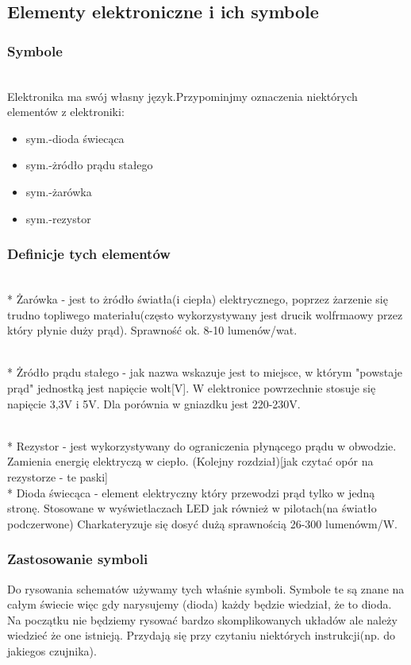 	\subsection{Elementy elektroniczne i ich symbole}
	\subsubsection {Symbole}
	\\Elektronika ma swój własny język.Przypominjmy oznaczenia niektórych elementów z elektroniki:
\begin{itemize}
	\item sym.-dioda świecąca
	\item sym.-żródło prądu stałego
	\item sym.-żarówka
	\item sym.-rezystor
\end{itemize}

   \subsubsection{Definicje tych elementów}
\\* Żarówka - jest to żródło światła(i ciepła) elektrycznego, poprzez żarzenie się trudno topliwego materiału(często wykorzystywany jest drucik wolfrmaowy przez który płynie duży prąd). Sprawność ok.
8-10 lumenów/wat. 

\\* Żródło prądu stałego - jak nazwa wskazuje jest to miejsce, w którym "powstaje prąd" jednostką jest napięcie wolt[V]. W elektronice powrzechnie stosuje się napięcie 3,3V i 5V. Dla porównia w gniazdku jest 220-230V.

\\* Rezystor - jest wykorzystywany do ograniczenia płynącego prądu w obwodzie. Zamienia energię elektryczą w ciepło. (Kolejny rozdział)[jak czytać opór na rezystorze - te paski]
\\* Dioda świecąca - element elektryczny który przewodzi prąd tylko w jedną stronę. Stosowane w wyświetlaczach LED jak również w pilotach(na światło podczerwone) Charkateryzuje się dosyć dużą sprawnością 26-300 lumenówm/W. 

\subsubsection{Zastosowanie symboli}
    
Do rysowania schematów używamy tych właśnie symboli. Symbole te są znane na całym świecie więc gdy narysujemy (dioda) każdy będzie wiedział, że to dioda. Na początku nie będziemy rysować bardzo skomplikowanych układów ale należy wiedzieć że one istnieją. Przydają się przy czytaniu niektórych instrukcji(np. do jakiegos czujnika).


